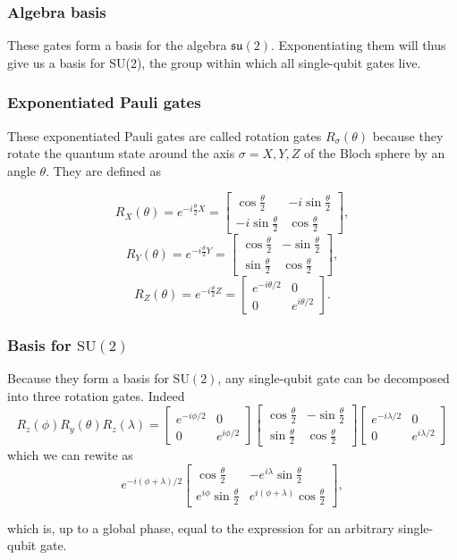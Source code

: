 \documentclass{beamer}
\begin{document}
\begin{frame}
\frametitle{Algebra basis}

These gates form a basis for
the algebra $\mathfrak{su}(2)$. Exponentiating them will thus give us
a basis for SU(2), the group within which all single-qubit gates
live.
\end{frame}

\begin{frame}
\frametitle{Exponentiated Pauli gates}

These exponentiated Pauli gates are called rotation gates
$R_{\sigma}(\theta)$ because they rotate the quantum state around the
axis $\sigma=X,Y,Z$ of the Bloch sphere by an angle $\theta$. They are
defined as

\[
R_X(\theta)=e^{-i\frac{\theta}{2}X}=
\begin{bmatrix}
\cos\frac{\theta}{2} & -i\sin\frac{\theta}{2} \\
-i\sin\frac{\theta}{2} & \cos\frac{\theta}{2} 
\end{bmatrix},
\]
\[
R_Y(\theta)=e^{-i\frac{\theta}{2}Y}=
\begin{bmatrix}
\cos\frac{\theta}{2} & -\sin\frac{\theta}{2} \\
\sin\frac{\theta}{2} & \cos\frac{\theta}{2} 
\end{bmatrix},
\]
\[
R_Z(\theta)=e^{-i\frac{\theta}{2}Z}=\begin{bmatrix}
e^{-i\theta/2} & 0 \\
0 & e^{i\theta/2}\end{bmatrix}.
\]
\end{frame}

\begin{frame}
\frametitle{Basis for $\mathrm{SU}(2)$}

Because they form a basis for $\mathrm{SU}(2)$, any single-qubit gate
can be decomposed into three rotation gates. Indeed
\[
R_z(\phi)R_y(\theta)R_z(\lambda)=
\begin{bmatrix}
e^{-i\phi/2} & 0 \\
0 & e^{i\phi/2}
\end{bmatrix}
\begin{bmatrix}
\cos\frac{\theta}{2} & -\sin\frac{\theta}{2} \\
\sin\frac{\theta}{2} & \cos\frac{\theta}{2} 
\end{bmatrix}
\begin{bmatrix}
e^{-i\lambda/2} & 0 \\
0 & e^{i\lambda/2}
\end{bmatrix}
\]
which we can rewite as
\[
e^{-i(\phi+\lambda)/2}
\begin{bmatrix}
\cos\frac{\theta}{2} & -e^{i\lambda}\sin\frac{\theta}{2}\\
e^{i\phi}\sin\frac{\theta}{2} & e^{i(\phi+\lambda)}\cos\frac{\theta}{2}
\end{bmatrix},
\]

which is, up to a global phase, equal to the expression for an arbitrary single-qubit gate.
\end{frame}
\end{document}
